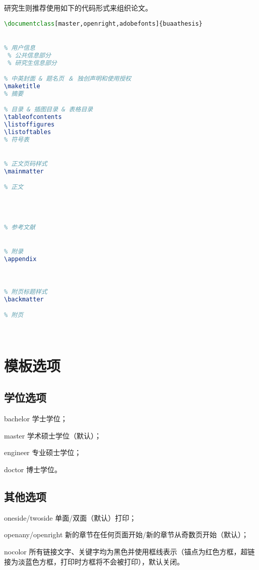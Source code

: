 \qquad 研究生则推荐使用如下的代码形式来组织论文。\par
\begin{lstlisting}[language={LaTeX}]
% !Mode:: "TeX:UTF-8"
\documentclass[master,openright,adobefonts]{buaathesis}


% 用户信息
 % 公共信息部分
 % 研究生信息部分

% 中英封面 & 题名页 ＆ 独创声明和使用授权
\maketitle
% 摘要

% 目录 & 插图目录 & 表格目录
\tableofcontents
\listoffigures
\listoftables
% 符号表


% 正文页码样式
\mainmatter

% 正文
	



% 参考文献


% 附录
\appendix



% 附页标题样式
\backmatter

% 附页




\end{lstlisting}
    
    \section{模板选项}
        \subsection{学位选项}
        \begin{description}
            \item{bachelor} 学士学位；
            \item{master} 学术硕士学位（默认）；
            \item{engineer} 专业硕士学位；
            \item{doctor} 博士学位。
        \end{description}

        \subsection{其他选项}
        \begin{description}
            \item{oneside\slash twoside} 单面\slash 双面（默认）打印；
            \item{openany\slash openright} 新的章节在任何页面开始\slash 新的章节从奇数页开始（默认）；
            \item{nocolor} 所有链接文字、关键字均为黑色并使用框线表示（锚点为红色方框，超链接为淡蓝色方框，打印时方框将不会被打印），默认关闭。
        \end{description}

